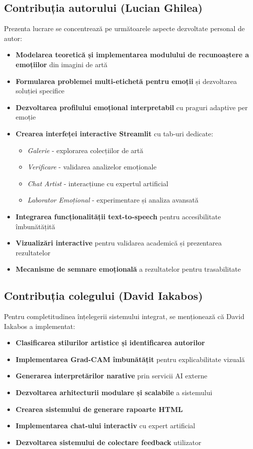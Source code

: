 \subsection*{Contribuția autorului (Lucian Ghilea)}
Prezenta lucrare se concentrează pe următoarele aspecte dezvoltate personal de autor:
\begin{itemize}
    \item \textbf{Modelarea teoretică și implementarea modulului de recunoaștere a emoțiilor} din imagini de artă
    \item \textbf{Formularea problemei multi-etichetă pentru emoții} și dezvoltarea soluției specifice
    \item \textbf{Dezvoltarea profilului emoțional interpretabil} cu praguri adaptive per emoție
    \item \textbf{Crearea interfeței interactive Streamlit} cu tab-uri dedicate:
        \begin{itemize}
            \item \emph{Galerie} - explorarea colecțiilor de artă
            \item \emph{Verificare} - validarea analizelor emoționale
            \item \emph{Chat Artist} - interacțiune cu expertul artificial
            \item \emph{Laborator Emoțional} - experimentare și analiza avansată
        \end{itemize}
    \item \textbf{Integrarea funcționalității text-to-speech} pentru accesibilitate îmbunătățită
    \item \textbf{Vizualizări interactive} pentru validarea academică și prezentarea rezultatelor
    \item \textbf{Mecanisme de semnare emoțională} a rezultatelor pentru trasabilitate
\end{itemize}

\subsection*{Contribuția colegului (David Iakabos)}
Pentru completitudinea înțelegerii sistemului integrat, se menționează că David Iakabos a implementat:
\begin{itemize}
    \item \textbf{Clasificarea stilurilor artistice și identificarea autorilor}
    \item \textbf{Implementarea Grad-CAM îmbunătățit} pentru explicabilitate vizuală
    \item \textbf{Generarea interpretărilor narative} prin servicii AI externe
    \item \textbf{Dezvoltarea arhitecturii modulare și scalabile} a sistemului
    \item \textbf{Crearea sistemului de generare rapoarte HTML}
    \item \textbf{Implementarea chat-ului interactiv} cu expert artificial
    \item \textbf{Dezvoltarea sistemului de colectare feedback} utilizator
\end{itemize}


